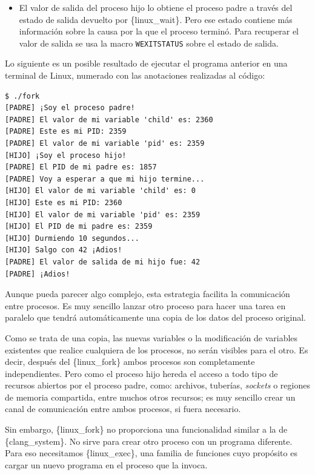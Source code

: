 \begin{itemize}
  Debemos asegurarnos de llamar a \{linux\_wait\} o \{linux\_waitpid\}
  una vez por cada proceso hijo, en algún momento, porque así es como el
  sistema sabe que el padre ya no tiene más interés en el proceso y
  puede liberar su PCB, donde se guarda el estado de salida. No hacerlo
  genera \textbf{procesos zombi}{} o \emph{defunct}.
\item
  El valor de salida del proceso hijo lo obtiene el proceso padre a
  través del estado de salida devuelto por \{linux\_wait\}. Pero ese
  estado contiene más información sobre la causa por la que el proceso
  terminó. Para recuperar el valor de salida se usa la macro
  \texttt{WEXITSTATUS} sobre el estado de salida.
\end{itemize}

Lo siguiente es un posible resultado de ejecutar el programa anterior en
una terminal de Linux, numerado con las anotaciones realizadas al
código:

\begin{verbatim}
$ ./fork
[PADRE] ¡Soy el proceso padre!
[PADRE] El valor de mi variable 'child' es: 2360 
[PADRE] Este es mi PID: 2359 
[PADRE] El valor de mi variable 'pid' es: 2359 
[HIJO] ¡Soy el proceso hijo!
[PADRE] El PID de mi padre es: 1857
[PADRE] Voy a esperar a que mi hijo termine...
[HIJO] El valor de mi variable 'child' es: 0 
[HIJO] Este es mi PID: 2360
[HIJO] El valor de mi variable 'pid' es: 2359 
[HIJO] El PID de mi padre es: 2359 
[HIJO] Durmiendo 10 segundos...
[HIJO] Salgo con 42 ¡Adios! 
[PADRE] El valor de salida de mi hijo fue: 42 
[PADRE] ¡Adios!
\end{verbatim}

Aunque pueda parecer algo complejo, esta estrategia facilita la
comunicación entre procesos. Es muy sencillo lanzar otro proceso para
hacer una tarea en paralelo que tendrá automáticamente una copia de los
datos del proceso original.

Como se trata de una copia, las nuevas variables o la modificación de
variables existentes que realice cualquiera de los procesos, no serán
visibles para el otro. Es decir, después del \{linux\_fork\} ambos
procesos son completamente independientes. Pero como el proceso hijo
hereda el acceso a todo tipo de recursos abiertos por el proceso padre,
como: archivos, tuberías, \emph{sockets} o regiones de memoria
compartida, entre muchos otros recursos; es muy sencillo crear un canal
de comunicación entre ambos procesos, si fuera necesario.

Sin embargo, \{linux\_fork\} no proporciona una funcionalidad similar a
la de \{clang\_system\}. No sirve para crear otro proceso con un
programa diferente. Para eso necesitamos \{linux\_exec\}, una familia de
funciones cuyo propósito es cargar un nuevo programa en el proceso que
la invoca.

